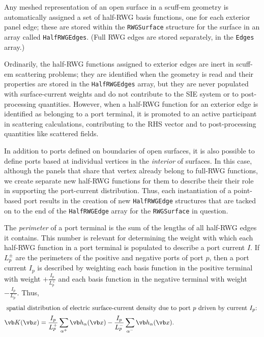 \documentclass[letterpaper]{article}
\begin{document}
Any meshed representation of an open surface in a {\sc scuff-em} geometry 
is automatically assigned a set of half-RWG basis functions, one 
for each exterior panel edge; these are stored 
within the \texttt{RWGSurface} structure for the surface
in an array called \texttt{HalfRWGEdges}. 
(Full RWG edges are stored separately, in the \texttt{Edges} array.)

Ordinarily, the half-RWG functions assigned to exterior edges are inert
in {\sc scuff-em} scattering problems; they are identified when the 
geometry is read and their properties are stored in the \texttt{HalfRWGEdges} 
array, but they are never populated with surface-current weights 
and do not contribute to the SIE system or to post-processing quantities. 
However, when a half-RWG function for an exterior edge is identified as 
belonging to a port terminal, it is promoted to an active participant 
in scattering calculations, contributing to the RHS vector and to 
post-processing quantities like scattered fields.

In addition to ports defined on boundaries of open surfaces, it is
also possible to define ports based at individual vertices
in the \textit{interior} of surfaces. In this case, although the panels
that share that vertex already belong to full-RWG functions,
we create separate new half-RWG functions for them to describe 
their their role in supporting the port-current distribution.
Thus, each instantiation of a point-based port results in the 
creation of new \texttt{HalfRWGEdge} structures that are tacked on 
to the end of the \texttt{HalfRWGEdge} array for the \texttt{RWGSurface}
in question.

The \textit{perimeter} of a port terminal is the sum of the lengths of
all half-RWG edges it contains. This number is relevant for determining
the weight with which each half-RWG function in a port terminal is
populated to describe a port current $I$.
If $L_{p}^\pm$ are the perimeters of the positive and negative ports
of port $p$, then a port current $I_p$ is described by weighting
each basis function in the positive terminal with weight
$+\frac{I_p}{L_p^+}$ and 
each basis function in the negative terminal with weight
$-\frac{I_p}{L_p^-}$. 
Thus, 
\begin{align}
\intertext{
spatial distribution of electric surface-current density due to port $p$
driven by current $I_p$:
}
\vb K(\vb x)&=
   \frac{I_p}{L_p^+} \sum_{\alpha^+} \vb h_\alpha(\vb x)
  -\frac{I_p}{L_p^-} \sum_{\alpha^-} \vb h_\alpha(\vb x).
\end{align}
\end{document}
